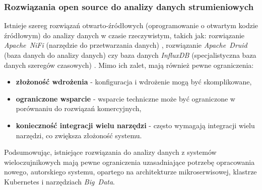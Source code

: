 \newpage

\subsubsection{Rozwiązania open source do analizy danych strumieniowych}
\label{subsubsec:open_source}

Istnieje szereg rozwiązań otwarto-źródłowych (oprogramowanie o otwartym kodzie źródłowym) do analizy danych w czasie rzeczywistym, takich jak: rozwiązanie \mbox{\textit{Apache NiFi}} (narzędzie do przetwarzania danych) \cite{apache_nifi},
rozwiązanie \mbox{\textit{Apache Druid}} (baza danych do analizy danych) \cite{apache_druid} czy baza danych \mbox{\textit{InfluxDB}} (specjalistyczna baza danych szeregów czasowych) \cite{influxdb}. Mimo ich zalet, mają również pewne ograniczenia:

\begin{itemize}
    \item \textbf{złożoność wdrożenia} - konfiguracja i wdrożenie mogą być skomplikowane,
    \item \textbf{ograniczone wsparcie} - wsparcie techniczne może być ograniczone w porównaniu do rozwiązań komercyjnych,
    \item \textbf{konieczność integracji wielu narzędzi} - często wymagają integracji wielu narzędzi, co zwiększa złożoność systemu.
\end{itemize}

\vspace{0.3em}

Podsumowując, istniejące rozwiązania do analizy danych z systemów wieloczujnikowych mają pewne ograniczenia uzasadniające potrzebę opracowania nowego, autorskiego systemu, opartego na architekturze mikroserwisowej, klastrze Kubernetes i narzędziach \mbox{\textit{Big Data}}.